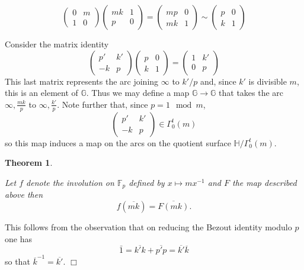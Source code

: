 \documentclass[12pt,a4paper]{amsart}
\newtheorem{thm}{Theorem}[section]
\def\GG{\mathbb{G}}
\def\fp{\mathbb{F}_p}
\begin{document}
\begin{equation}
\begin{pmatrix}
	0 & m \\ 1 & 0
\end{pmatrix}
\begin{pmatrix}
mk & 1 \\
p & 0
\end{pmatrix}
= 
\begin{pmatrix}
mp & 0 \\
mk  & 1
\end{pmatrix}
\sim
\begin{pmatrix}
p & 0 \\
k & 1
\end{pmatrix}
\end{equation}

Consider the matrix identity
\begin{equation}
\begin{pmatrix}
p' & k' \\
-k & p
\end{pmatrix}
\begin{pmatrix}
p & 0 \\
k & 1
\end{pmatrix}
= 
\begin{pmatrix}
1 & k' \\
0  & p
\end{pmatrix}
\end{equation}
This last matrix represents 
the arc joining $\infty$ to $k'/p$ 
and, since $k'$ is divisible $m$,
this is an element of $\GG$.
Thus we may define a map $\GG  \rightarrow \GG $ that takes the arc $\infty, \frac{mk}{p}$ to $\infty,
	\frac{k'}{p}$.
Note further that, 
since $ p =  1 \mod m$,
$$
\begin{pmatrix}
p' & k' \\
-k & p
\end{pmatrix}
\in \Gamma^t _0(m)$$
so this map induces a map on the arcs on the quotient surface
$\mathbb{H}/\Gamma^t_0(m)$.




\begin{thm} \label{actions agree}
	
Let $f$ denote the involution on $\fp $ defined by $ x \mapsto mx^{-1}$ 
and $F$ the map described above then 
$$ f(\overline{mk}) = \overline{F(mk)}.$$
\end{thm}

\proof
This follows from the observation that on reducing the Bezout
identity modulo $p$ one has
$$\bar{1} = \overline{k'k} + \overline{p'p}=  \overline{k'}\overline{k} $$
so that $\overline{k}^{-1} = \overline{k'}.$
\hfill $\Box$
\end{document}
